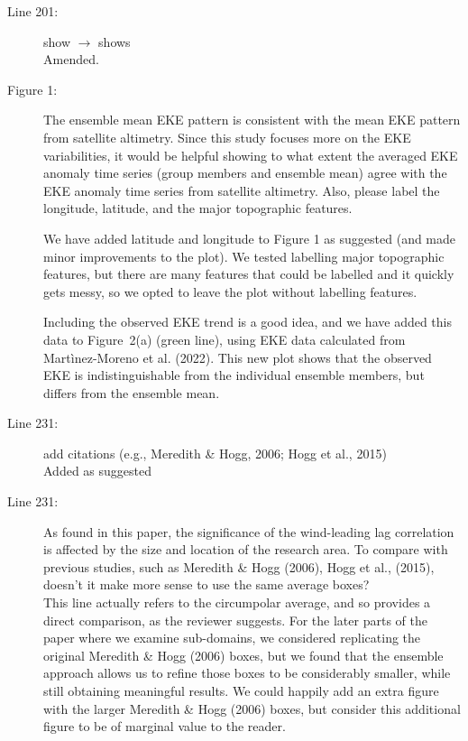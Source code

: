 \documentclass[11pt]{article}
\begin{document}
{\begin{description}
\item[Line 201:] show $\to$ shows\\
{\color{black} Amended. }

\item[Figure 1:] The ensemble mean EKE pattern is consistent with the mean EKE pattern from satellite altimetry. Since this study focuses more on the EKE variabilities, it would be helpful showing to what extent the averaged EKE anomaly time series (group members and ensemble mean) agree with the EKE anomaly time series from satellite altimetry. Also, please label the longitude, latitude, and the major topographic features. \\
{\color{black}  We have added latitude and longitude to Figure 1 as suggested (and made minor improvements to the plot).
We tested labelling major topographic features, but there are many features that could be labelled and it quickly gets messy, so we opted to leave the plot without labelling features.

Including the observed EKE trend is a good idea, and we have added this data to Figure~2(a) (green line), using EKE data calculated from Mart\`inez-Moreno et al. (2022).
This new plot shows that the observed EKE is indistinguishable from the individual ensemble members, but differs from the ensemble mean.}

\item[Line 231:] add citations (e.g., Meredith \& Hogg, 2006; Hogg et al., 2015) \\
{\color{black} Added as suggested }

\item[Line 231:] As found in this paper, the significance of the wind-leading lag correlation is affected by the size and location of the research area. To compare with previous studies, such as Meredith \& Hogg (2006), Hogg et al., (2015), doesn't it make more sense to use the same average boxes? \\
{\color{black} This line actually refers to the circumpolar average, and so provides a direct comparison, as the reviewer suggests.  
For the later parts of the paper where we examine sub-domains, we considered replicating the original Meredith \& Hogg (2006) boxes, but we found that the ensemble approach allows us to refine those boxes to be considerably smaller, while still obtaining meaningful results.
We could happily add an extra figure with the larger Meredith \& Hogg (2006) boxes, but consider this additional figure to be of marginal value to the reader.}


\end{description}}
\end{document}
